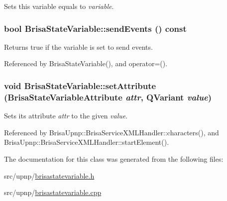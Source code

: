 Sets this variable equals to {\itshape variable\/}. \hypertarget{classBrisaUpnp_1_1BrisaStateVariable_a71040c4fb731b7c285d5fe1a4d625af6}{
\subsubsection[{sendEvents}]{\setlength{\rightskip}{0pt plus 5cm}bool BrisaStateVariable::sendEvents () const}}
\label{classBrisaUpnp_1_1BrisaStateVariable_a71040c4fb731b7c285d5fe1a4d625af6}


Returns true if the variable is set to send events. 

Referenced by BrisaStateVariable(), and operator=().\hypertarget{classBrisaUpnp_1_1BrisaStateVariable_acdd6630338a3855a59e707b2095df677}{
\subsubsection[{setAttribute}]{\setlength{\rightskip}{0pt plus 5cm}void BrisaStateVariable::setAttribute ({\bf BrisaStateVariableAttribute} {\em attr}, \/  QVariant {\em value})}}
\label{classBrisaUpnp_1_1BrisaStateVariable_acdd6630338a3855a59e707b2095df677}


Sets its attribute {\itshape attr\/} to the given {\itshape value\/}. 

Referenced by BrisaUpnp::BrisaServiceXMLHandler::characters(), and BrisaUpnp::BrisaServiceXMLHandler::startElement().

The documentation for this class was generated from the following files:\begin{DoxyCompactItemize}
\item 
src/upnp/\hyperlink{brisastatevariable_8h}{brisastatevariable.h}\item 
src/upnp/\hyperlink{brisastatevariable_8cpp}{brisastatevariable.cpp}\end{DoxyCompactItemize}
